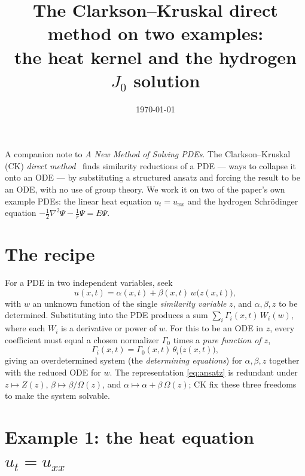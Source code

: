 \documentclass[11pt]{article}
\title{The Clarkson--Kruskal direct method on two examples:\\
       the heat kernel and the hydrogen $J_0$ solution}
\author{}
\date{\today}
\begin{document}
\maketitle

\noindent
A companion note to \emph{A New Method of Solving PDEs}. The
Clarkson--Kruskal (CK) \emph{direct method}~\cite{CK1989,CM1994} finds
similarity reductions of a PDE --- ways to collapse it onto an ODE --- by
substituting a structured ansatz and forcing the result to be an ODE,
with no use of group theory. We work it on two of the paper's own example
PDEs: the linear heat equation $u_t=u_{xx}$ and the hydrogen
Schr\"odinger equation $-\tfrac12\nabla^2\Psi-\tfrac1r\Psi=E\Psi$.

\section{The recipe}

For a PDE in two independent variables, seek
\begin{equation}
  u(x,t)=\alpha(x,t)+\beta(x,t)\,w\bigl(z(x,t)\bigr),
  \label{eq:ansatz}
\end{equation}
with $w$ an unknown function of the single \emph{similarity variable} $z$,
and $\alpha,\beta,z$ to be determined. Substituting into the PDE produces a
sum $\sum_i\Gamma_i(x,t)\,W_i(w)$, where each $W_i$ is a derivative or power
of $w$. For this to be an ODE in $z$, every coefficient must equal a chosen
normalizer $\Gamma_0$ times a \emph{pure function of $z$},
\begin{equation}
  \Gamma_i(x,t)=\Gamma_0(x,t)\,\theta_i\bigl(z(x,t)\bigr),
  \label{eq:closure}
\end{equation}
giving an overdetermined system (the \emph{determining equations}) for
$\alpha,\beta,z$ together with the reduced ODE for $w$. The representation
\eqref{eq:ansatz} is redundant under $z\mapsto Z(z)$, $\beta\mapsto\beta/\Omega(z)$,
and $\alpha\mapsto\alpha+\beta\,\Omega(z)$; CK fix these three freedoms to
make the system solvable.

\section{Example 1: the heat equation $u_t=u_{xx}$}
\end{document}
